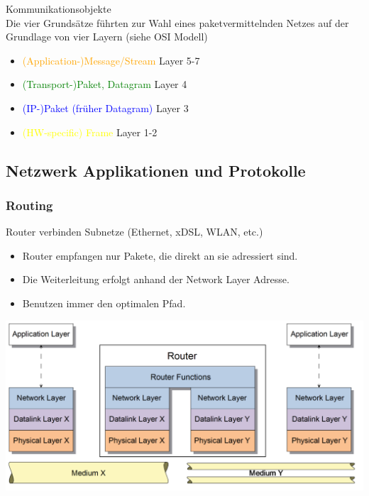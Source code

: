 \begin{definition}{Kommunikationsobjekte}\\
    Die vier Grundsätze führten zur Wahl eines paketvermittelnden Netzes auf der Grundlage von vier Layern (siehe OSI Modell)

    \begin{itemize}
        \item \textcolor{orange}{(Application-)Message/Stream} Layer 5-7
        \item \textcolor{green}{(Transport-)Paket, Datagram} Layer 4
        \item \textcolor{blue}{(IP-)Paket (früher Datagram)} Layer 3
        \item \textcolor{yellow}{(HW-specific) Frame} Layer 1-2
    \end{itemize}
\end{definition}



\subsection{Netzwerk Applikationen und Protokolle}

\subsubsection{Routing}

\begin{definition}{Router} verbinden Subnetze (Ethernet, xDSL, WLAN, etc.)
    \begin{itemize}
        \item Router empfangen nur Pakete, die direkt an sie adressiert sind.
        \item Die Weiterleitung erfolgt anhand der Network Layer Adresse.
        \item Benutzen immer den optimalen Pfad.
    \end{itemize}
    \includegraphics[width=0.9\linewidth]{images/router2.png}
\end{definition}
    

